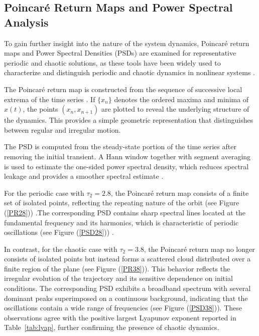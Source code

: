 \documentclass[11pt]{article}
\theoremstyle{remark}
\begin{document}
{
\subsection{Poincar\'e Return Maps and Power Spectral Analysis}
To gain further insight into the nature of the system dynamics, Poincar\'e return maps and Power Spectral Densities (PSDs) are examined for representative periodic and chaotic solutions, as these tools have been widely used to characterize and distinguish periodic and chaotic dynamics in nonlinear systems \cite{shahriari2023ordinal,yan2024construction,thamilmaran2024extreme}.

The Poincar\'e return map is constructed from the sequence of successive local extrema of the time series \cite{burykin2014dynamical}. If $\{x_n\}$ denotes the ordered maxima and minima of $x(t)$, the points $(x_n,x_{n+1})$ are plotted to reveal the underlying structure of the dynamics. This provides a simple geometric representation that distinguishes between regular and irregular motion.

The PSD is computed from the steady-state portion of the time series after removing the initial transient. A Hann window together with segment averaging is used to estimate the one-sided power spectral density, which reduces spectral leakage and provides a smoother spectral estimate \cite{mensour1998power}.

For the periodic case with $\tau_2=2.8$, the Poincar\'e return map consists of a finite set of isolated points, reflecting the repeating nature of the orbit (see Figure (\ref{PR28})) .The corresponding PSD contains sharp spectral lines located at the fundamental frequency and its harmonics, which is characteristic of periodic oscillations (see Figure (\ref{PSD28})) .

In contrast, for the chaotic case with $\tau_2=3.8$, the Poincar\'e return map no longer consists of isolated points but instead forms a scattered cloud distributed over a finite region of the plane (see Figure (\ref{PR38})). This behavior reflects the irregular evolution of the trajectory and its sensitive dependence on initial conditions. The corresponding PSD exhibits a broadband spectrum with several dominant peaks superimposed on a continuous background, indicating that the oscillations contain a wide range of frequencies (see Figure (\ref{PSD38})). These observations agree with the positive largest Lyapunov exponent reported in Table~\ref{tab:lyap}, further confirming the presence of chaotic dynamics.


}
\end{document}
